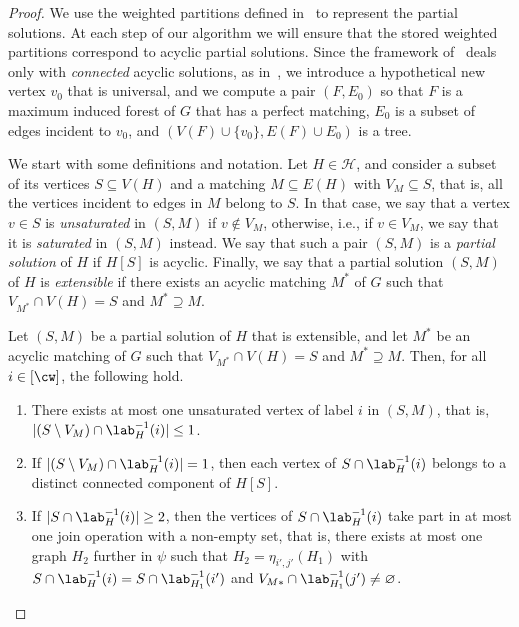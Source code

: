 \begin{proof}
    We use the weighted partitions defined in~\cite{tcs/BergougnouxK19} to represent the partial solutions.
    At each step of our algorithm we will ensure that the stored weighted partitions correspond to acyclic partial solutions.
    Since the framework of~\cite{tcs/BergougnouxK19} deals only with \emph{connected} acyclic solutions,
    as in~\cite{tcs/BergougnouxK19}, we introduce a hypothetical new vertex $v_0$ that is universal,
    and we compute a pair $(F,E_0)$ so that $F$ is a maximum induced forest of $G$ that has a perfect matching,
    $E_0$ is a subset of edges incident to $v_0$,
    and $(V(F) \cup \{v_0\}, E(F) \cup E_0)$ is a tree.

    We start with some definitions and notation.
    Let $H \in \mathcal{H}$, and consider a subset of its vertices $S \subseteq V(H)$ and
    a matching $M \subseteq E(H)$ with $V_M \subseteq S$, that is, all the vertices incident to
    edges in $M$ belong to $S$.
    In that case, we say that a vertex $v \in S$ is \emph{unsaturated} in $(S,M)$ if $v \notin V_M$,
    otherwise, i.e., if $v \in V_M$, we say that it is \emph{saturated} in $(S,M)$ instead.
    We say that such a pair $(S,M)$ is a \emph{partial solution} of $H$ if $H[S]$ is acyclic.
    Finally, we say that a partial solution $(S,M)$ of $H$ is \emph{extensible} if there exists an acyclic matching $M^*$ of
    $G$ such that $V_{M^*} \cap V(H) = S$ and $M^* \supseteq M$.

    \begin{claim}\label{claim:acyclic:cw:algorithm}
        Let $(S,M)$ be a partial solution of $H$ that is extensible,
        and let $M^*$ be an acyclic matching of $G$ such that
        $V_{M^*} \cap V(H) = S$ and $M^* \supseteq M$.
        Then, for all $i \in [\cw]$, the following hold.
        \begin{enumerate}
            \item There exists at most one unsaturated vertex of label $i$ in $(S,M)$,
            that is, $|(S \setminus V_M) \cap \lab^{-1}_H(i)| \le 1$.

            \item If $|(S \setminus V_M) \cap \lab^{-1}_H(i)| = 1$,
            then each vertex of $S \cap \lab^{-1}_H(i)$ belongs to a distinct connected component of $H[S]$.

            \item If $|S \cap \lab^{-1}_H(i)| \ge 2$,
            then the vertices of $S \cap \lab^{-1}_H(i)$ take part in at most one join operation
            with a non-empty set,
            that is, there exists at most one graph $H_2$ further in $\psi$
            such that $H_2 = \eta_{i',j'}(H_1)$ with $S \cap \lab^{-1}_H(i) = S \cap \lab^{-1}_{H_1}(i')$
            and $V_{M*} \cap \lab^{-1}_{H_1}(j') \neq \varnothing$.
        \end{enumerate}
    \end{claim}


\end{proof}
